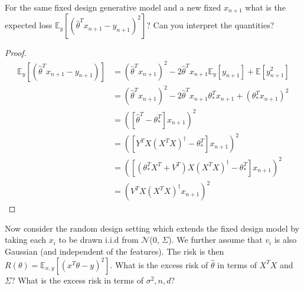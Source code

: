 \begin{exercise}
For the same fixed design generative model and a new fixed $x_{n+1}$ what is the expected loss $\mathbb{E}_y[(\hat{\theta}^Tx_{n+1}-y_{n+1})^2]$? Can you interpret the quantities?
\end{exercise}
\begin{proof}
\begin{align*}
    \mathbb{E}_y[(\hat{\theta}^Tx_{n+1}-y_{n+1})]
    &=(\hat{\theta}^Tx_{n+1})^2-2\hat{\theta}^Tx_{n+1}\mathbb{E}_y[y_{n+1}]+\mathbb{E}[y_{n+1}^2] \\
    &=(\hat{\theta}^Tx_{n+1})^2-2\hat{\theta}^Tx_{n+1}\theta_{*}^Tx_{n+1}+(\theta_{*}^Tx_{n+1})^2 \\
    &=([\hat{\theta}^T-\theta_{*}^T]x_{n+1})^2\\
    &=([Y^TX(X^TX)^{\dag}-\theta_{*}^T]x_{n+1})^2\\
    &=([(\theta_{*}^TX^T+V^T)X(X^TX)^{\dag}-\theta_{*}^T]x_{n+1})^2\\
    &=(V^TX(X^TX)^{\dag}x_{n+1})^2
\end{align*}
\end{proof}

\begin{exercise}
    Now consider the random design setting which extends the fixed design model by taking each $x_{i}$ to be drawn i.i.d from $\mathcal{N}$($0$, $\Sigma$). 
    We further assume that $v_{i}$ is also Gaussian (and independent of the features).
    The risk is then $R(\theta) = \mathbb{E}_{x,y}[(x^{T}\theta - y)^{2}]$. What is the excess risk of $\hat{\theta}$ in terms of $X^{T}X$ and $\Sigma$? What is the excess risk in terms of $\sigma^{2}, n, d$?
\end{exercise}



